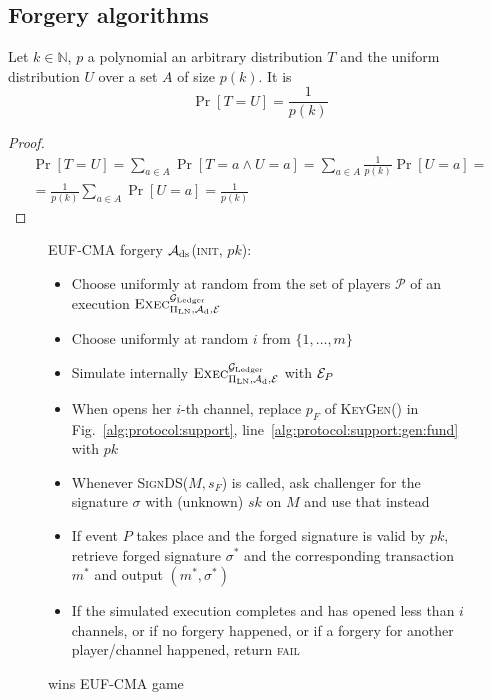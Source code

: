 \subsection{Forgery algorithms}
  \begin{proposition}
  \label{prop:distrib}
    Let $k \in \mathbb{N}$, $p$ a polynomial an arbitrary distribution $T$ and
    the uniform distribution $U$ over a set $A$ of size $p(k)$. It is
    \begin{equation*}
      \Pr[T = U] = \frac{1}{p(k)}
    \end{equation*}
  \end{proposition}

  \begin{proof}
    \begin{gather*}
      \Pr[T = U] = \sum\limits_{a \in A}\Pr[T = a \wedge U = a] = \sum\limits_{a
      \in A}\frac{1}{p(k)}\Pr[U = a] =\\
      = \frac{1}{p(k)}\sum\limits_{a \in A}\Pr[U = a] = \frac{1}{p(k)}
    \end{gather*}
  \end{proof}

  \begin{figure}[!htbp]
    \begin{algobox}{\textsf{EUF-CMA} forgery}
      $\mathcal{A}_{\mathrm{ds}}$(\textsc{init}, $pk$):
      \begin{itemize}
        \item Choose uniformly at random \alice{} from the set of players
        $\mathcal{P}$ of an execution
        $\textsc{Exec}^{\mathcal{G}_{\mathrm{Ledger}}}_{\Pi_{\mathrm{LN}}, \mathcal{A}_{\mathrm{d}},
        \mathcal{E}}$
        \item Choose uniformly at random $i$ from $\{1, \dots, m\}$
        \item Simulate internally
        $\textsc{Exec}^{\mathcal{G}_{\mathrm{Ledger}}}_{\Pi_{\mathrm{LN}}, \mathcal{A}_{\mathrm{d}},
        \mathcal{E}}$ with $\mathcal{E}_P$
        \item When \alice{} opens her $i$-th channel, replace $p_F$ of
        \textsc{KeyGen}() in Fig.~\ref{alg:protocol:support},
        line~\ref{alg:protocol:support:gen:fund} with $pk$
        \item Whenever \textsc{SignDS}($M, s_F$) is called, ask challenger for
        the signature $\sigma$ with (unknown) $sk$ on $M$ and use that instead
        \item If event $P$ takes place and the forged signature is valid by
        $pk$, retrieve forged signature $\sigma^*$ and the corresponding
        transaction $m^*$ and output $(m^*, \sigma^*)$
        \item If the simulated execution completes and \alice{} has opened less
        than $i$ channels, or if no forgery happened, or if a forgery for
        another player/channel happened, return \textsc{fail}
      \end{itemize}
    \end{algobox}
    \caption{wins \textsf{EUF-CMA} game}
    \label{alg:forge:ds}
  \end{figure}

